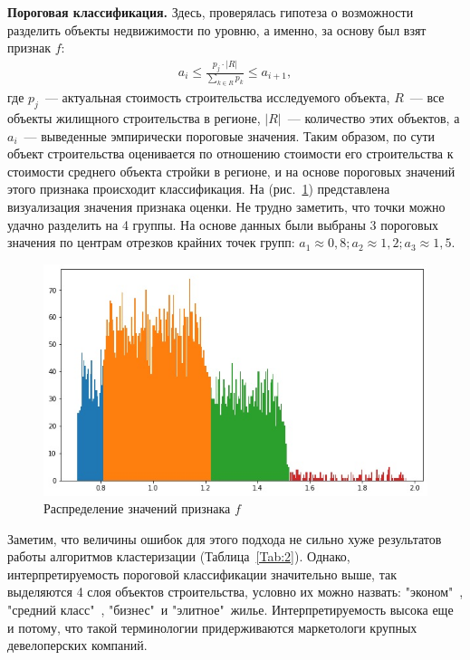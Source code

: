 \documentclass[12pt,a4paper]{article} %
\begin{document}
\newpage

\textbf{Пороговая классификация.} Здесь, проверялась гипотеза о возможности разделить объекты недвижимости по уровню, а именно, за основу был взят признак $f$:
\begin{gather}\label{pklas1}
	a_i\leq \frac{p_j\cdot|R|}{\sum\limits_{k\in R} p_k}\leq a_{i+1},
\end{gather}
где $p_j$~--- актуальная стоимость строительства исследуемого объекта, $R$~--- все объекты жилищного строительства в регионе, $|R|$~--- количество этих объектов, а $a_i$~--- выведенные эмпирически пороговые значения. Таким образом, по сути объект строительства оценивается по отношению стоимости его строительства к стоимости среднего объекта стройки в регионе, и на основе пороговых значений этого признака происходит классификация. На (рис.~\ref{fig:porclas}) представлена визуализация значения признака оценки. Не трудно заметить, что точки можно удачно разделить на 4 группы. На основе данных были выбраны 3 пороговых значения по центрам отрезков крайних точек групп: $a_1 \approx 0,8; a_2 \approx 1,2; a_3 \approx 1,5$.

\begin{figure}[h]
	
	\centering
	
	\includegraphics[width=0.8\linewidth]{porclas.jpg}
	
	\caption{Распределение значений признака $f$ }
	
	\label{fig:porclas}
	
\end{figure} 

Заметим, что величины ошибок для этого подхода не сильно хуже результатов работы алгоритмов кластеризации (Таблица~\ref{Tab:2}). Однако, интерпретируемость пороговой классификации значительно выше, так выделяются 4 слоя объектов строительства, условно их можно назвать: "эконом"\ , "средний класс"\ , "бизнес"\ и "элитное"\ жилье. Интерпретируемость высока еще и потому, что такой терминологии придерживаются маркетологи крупных девелоперских компаний. 
\end{document}
